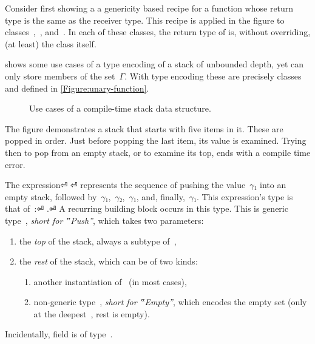 Consider first  showing a a genericity based recipe for
  a function whose return type
  is the same as the receiver type.
  This recipe is applied in the figure to classes~,~, and~.
  In each of these classes, the return type of  is,
  without overriding, (at least) the class itself.

 shows some use cases of a type encoding of
  a stack of unbounded depth, yet can only store members of the set~$Γ$.
With type encoding these are precisely classes~
  and  defined in \cref{Figure:unary-function}.

\begin{figure}[!htp]
  \caption{\label{Figure:stack-use-cases}%
    Use cases of a compile-time stack data structure.
  }
\end{figure}

The figure demonstrates a stack that starts with five items in it.
These are popped in order. Just before popping the last item, its
  value is examined.
Trying then to pop from an empty stack, or to examine its top, ends with
  a compile time error.

The expression⏎
  \mbox{\qquad\qquad} ⏎
represents the sequence of pushing the value~$γ₁$ into an
empty stack, followed by~$γ₁$,~$γ₂$,~$γ₁$, and, finally,~$γ₁$.
This expression's type is that of~:⏎
\mbox{\qquad\qquad} .⏎
A recurring building block occurs in this type.
This is generic type~, \emph{short for ‟Push”}, which takes two parameters:
  \begin{enumerate}
    \item the \emph{top} of the stack, always a subtype of~,
    \item the \emph{rest} of the stack, which can be of two kinds:
          \begin{enumerate}
            \item another instantiation of~ (in most cases),
            \item non-generic type~, \emph{short for ‟Empty”}, which encodes the empty
                  set (only at the deepest~, rest is empty).
          \end{enumerate}
  \end{enumerate}
Incidentally,  field  is of type~.

